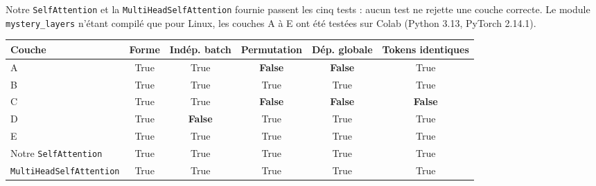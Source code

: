 \documentclass{report}
\begin{document}
Notre \texttt{SelfAttention} et la \texttt{MultiHeadSelfAttention} fournie passent les cinq tests : aucun test ne rejette une couche correcte. Le module \texttt{mystery\_layers} n'étant compilé que pour Linux, les couches A à E ont été testées sur Colab (Python 3.13, PyTorch 2.14.1).

\begin{table}[H]
\centering
\footnotesize
\begin{tabular}{lccccc}
\toprule
\textbf{Couche} & \textbf{Forme} & \textbf{Indép. batch} & \textbf{Permutation} & \textbf{Dép. globale} & \textbf{Tokens identiques} \\
\midrule
A & True & True & \textbf{False} & \textbf{False} & True \\
B & True & True & True & True & True \\
C & True & True & \textbf{False} & \textbf{False} & \textbf{False} \\
D & True & \textbf{False} & True & True & True \\
E & True & True & True & True & True \\
\midrule
Notre \texttt{SelfAttention} & True & True & True & True & True \\
\texttt{MultiHeadSelfAttention} & True & True & True & True & True \\
\bottomrule
\end{tabular}
\end{table}
\end{document}
